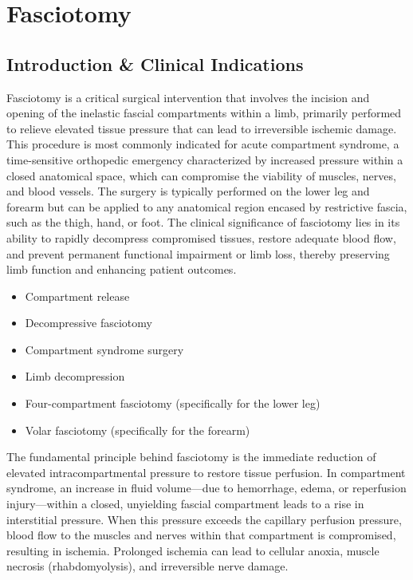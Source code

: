 \chapter{Fasciotomy}

\section*{Introduction \& Clinical Indications}
Fasciotomy is a critical surgical intervention that involves the incision and opening of the inelastic fascial compartments within a limb, primarily performed to relieve elevated tissue pressure that can lead to irreversible ischemic damage. This procedure is most commonly indicated for acute compartment syndrome, a time-sensitive orthopedic emergency characterized by increased pressure within a closed anatomical space, which can compromise the viability of muscles, nerves, and blood vessels. The surgery is typically performed on the lower leg and forearm but can be applied to any anatomical region encased by restrictive fascia, such as the thigh, hand, or foot. The clinical significance of fasciotomy lies in its ability to rapidly decompress compromised tissues, restore adequate blood flow, and prevent permanent functional impairment or limb loss, thereby preserving limb function and enhancing patient outcomes.

\begin{itemize}
  \item Compartment release
  \item Decompressive fasciotomy
  \item Compartment syndrome surgery
  \item Limb decompression
  \item Four-compartment fasciotomy (specifically for the lower leg)
  \item Volar fasciotomy (specifically for the forearm)
\end{itemize}

The fundamental principle behind fasciotomy is the immediate reduction of elevated intracompartmental pressure to restore tissue perfusion. In compartment syndrome, an increase in fluid volume—due to hemorrhage, edema, or reperfusion injury—within a closed, unyielding fascial compartment leads to a rise in interstitial pressure. When this pressure exceeds the capillary perfusion pressure, blood flow to the muscles and nerves within that compartment is compromised, resulting in ischemia. Prolonged ischemia can lead to cellular anoxia, muscle necrosis (rhabdomyolysis), and irreversible nerve damage.

